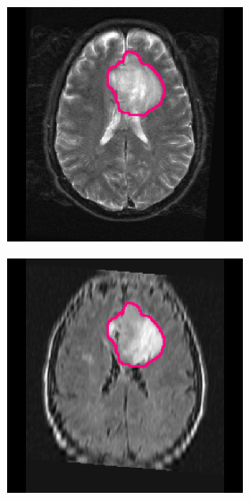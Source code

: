 \begin{subappendices}
\begin{figure}[htbp]
\begin{subfigure}[b]{0.8\textwidth}
\begin{subfigure}[b]{0.215\textwidth}
        \end{subfigure}
        \hfill
        \begin{subfigure}[b]{0.215\textwidth}
        \includegraphics[width=\textwidth, clip, trim=2.5cm 0.5cm 2.5cm 0.5cm]{Figures/Random_segs/T2_TCGA-12-1094.png}
        \end{subfigure}
        \hfill
        \begin{subfigure}[b]{0.215\textwidth}
        \includegraphics[width=\textwidth, clip, trim=2.5cm 0.5cm 2.5cm 0.5cm]{Figures/Random_segs/FLAIR_TCGA-12-1094.png}

\end{subfigure}
\end{subfigure}
\end{figure}
\end{subappendices}

